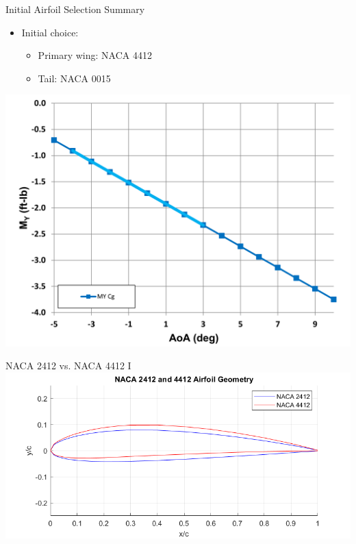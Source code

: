\documentclass{beamer}
\begin{document}
    \begin{frame}{Initial Airfoil Selection Summary}
        \begin{itemize}
            \item Initial choice:
            \begin{itemize}
                \item Primary wing: NACA 4412
                \item Tail: NACA 0015
            \end{itemize}
        \end{itemize}
        \centering
        \includegraphics[width=0.75\linewidth]{figures/pitchV1.1.12.png}
    \end{frame}

    \begin{frame}{NACA 2412 vs. NACA 4412 I}
        \centering
        \includegraphics[width=\textwidth]{figures/newfoil.png}
    \end{frame}
\end{document}
